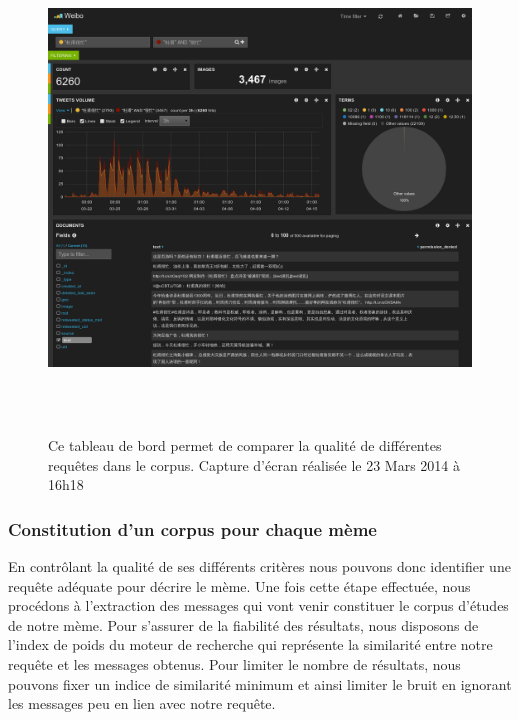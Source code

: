     \begin{figure}[htpb]
        \centering
        \includegraphics[width=6.0004in,height=5.078in]{figures/chap4/ui/ui-kibana.png}
        \caption[Tableau de bords requêtes par mots-clés] { Ce tableau de bord permet de comparer la qualité de différentes requ\^etes dans le corpus. Capture d'écran réalisée le 23 Mars 2014 à 16h18}
    \end{figure}

\subsubsection[Constitution d'un corpus pour chaque mème]{Constitution d'un corpus pour chaque mème}

    En contrôlant la qualité de ses différents critères nous pouvons donc identifier une requête adéquate pour décrire le mème. Une fois cette étape effectuée, nous procédons à l'extraction des messages qui vont venir constituer le corpus d'études de notre mème. Pour s'assurer de la fiabilité des résultats, nous disposons de l'index de poids du moteur de recherche qui représente la similarité entre notre requête et les messages obtenus. Pour limiter le nombre de résultats, nous pouvons fixer un indice de similarité minimum et ainsi limiter le bruit en ignorant les messages peu en lien avec notre requête.

